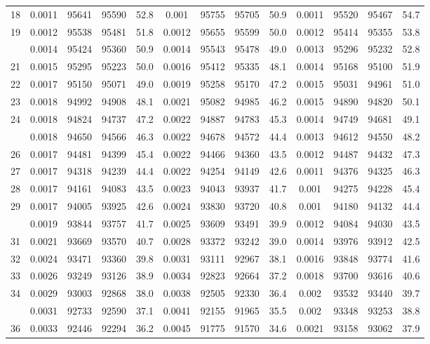 \documentclass[
  14pt,
]{article}
\begin{document}
\begin{longtable}[t]{lcccccccccccc}
18 & 0.0011 & 95641 & 95590 & 52.8 & 0.001 & 95755 & 95705 & 50.9 & 0.0011 & 95520 & 95467 & 54.7\\
19 & 0.0012 & 95538 & 95481 & 51.8 & 0.0012 & 95655 & 95599 & 50.0 & 0.0012 & 95414 & 95355 & 53.8\\
\addlinespace
20 & 0.0014 & 95424 & 95360 & 50.9 & 0.0014 & 95543 & 95478 & 49.0 & 0.0013 & 95296 & 95232 & 52.8\\
21 & 0.0015 & 95295 & 95223 & 50.0 & 0.0016 & 95412 & 95335 & 48.1 & 0.0014 & 95168 & 95100 & 51.9\\
22 & 0.0017 & 95150 & 95071 & 49.0 & 0.0019 & 95258 & 95170 & 47.2 & 0.0015 & 95031 & 94961 & 51.0\\
23 & 0.0018 & 94992 & 94908 & 48.1 & 0.0021 & 95082 & 94985 & 46.2 & 0.0015 & 94890 & 94820 & 50.1\\
24 & 0.0018 & 94824 & 94737 & 47.2 & 0.0022 & 94887 & 94783 & 45.3 & 0.0014 & 94749 & 94681 & 49.1\\
\addlinespace
25 & 0.0018 & 94650 & 94566 & 46.3 & 0.0022 & 94678 & 94572 & 44.4 & 0.0013 & 94612 & 94550 & 48.2\\
26 & 0.0017 & 94481 & 94399 & 45.4 & 0.0022 & 94466 & 94360 & 43.5 & 0.0012 & 94487 & 94432 & 47.3\\
27 & 0.0017 & 94318 & 94239 & 44.4 & 0.0022 & 94254 & 94149 & 42.6 & 0.0011 & 94376 & 94325 & 46.3\\
28 & 0.0017 & 94161 & 94083 & 43.5 & 0.0023 & 94043 & 93937 & 41.7 & 0.001 & 94275 & 94228 & 45.4\\
29 & 0.0017 & 94005 & 93925 & 42.6 & 0.0024 & 93830 & 93720 & 40.8 & 0.001 & 94180 & 94132 & 44.4\\
\addlinespace
30 & 0.0019 & 93844 & 93757 & 41.7 & 0.0025 & 93609 & 93491 & 39.9 & 0.0012 & 94084 & 94030 & 43.5\\
31 & 0.0021 & 93669 & 93570 & 40.7 & 0.0028 & 93372 & 93242 & 39.0 & 0.0014 & 93976 & 93912 & 42.5\\
32 & 0.0024 & 93471 & 93360 & 39.8 & 0.0031 & 93111 & 92967 & 38.1 & 0.0016 & 93848 & 93774 & 41.6\\
33 & 0.0026 & 93249 & 93126 & 38.9 & 0.0034 & 92823 & 92664 & 37.2 & 0.0018 & 93700 & 93616 & 40.6\\
34 & 0.0029 & 93003 & 92868 & 38.0 & 0.0038 & 92505 & 92330 & 36.4 & 0.002 & 93532 & 93440 & 39.7\\
\addlinespace
35 & 0.0031 & 92733 & 92590 & 37.1 & 0.0041 & 92155 & 91965 & 35.5 & 0.002 & 93348 & 93253 & 38.8\\
36 & 0.0033 & 92446 & 92294 & 36.2 & 0.0045 & 91775 & 91570 & 34.6 & 0.0021 & 93158 & 93062 & 37.9\\

\end{longtable}
\end{document}
